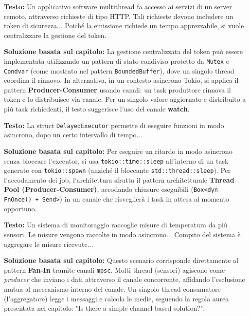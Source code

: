 \begin{exambox}
\textbf{Testo:} Un applicativo software multithread fa accesso ai servizi di un server remoto, attraverso richieste di tipo HTTP. Tali richieste devono includere un token di sicurezza... Poiché la emissione richiede un tempo apprezzabile, si vuole centralizzare la gestione del token.

\textbf{Soluzione basata sul capitolo:} La gestione centralizzata del token può essere implementata utilizzando un pattern di stato condiviso protetto da \texttt{Mutex} e \texttt{Condvar} (come mostrato nel pattern \texttt{BoundedBuffer}), dove un singolo thread coordina il rinnovo. In alternativa, in un contesto asincrono Tokio, si applica il pattern \textbf{Producer-Consumer} usando canali: un task produttore rinnova il token e lo distribuisce via canale. Per un singolo valore aggiornato e distribuito a più task richiedenti, il testo suggerisce l'uso del canale \textbf{watch}.
\end{exambox}

\begin{exambox}
\textbf{Testo:} La struct \texttt{DelayedExecutor} permette di eseguire funzioni in modo asincrono, dopo un certo intervallo di tempo...

\textbf{Soluzione basata sul capitolo:} Per eseguire un ritardo in modo asincrono senza bloccare l'executor, si usa \texttt{tokio::time::sleep} all'interno di un task generato con \texttt{tokio::spawn} (anziché il bloccante \texttt{std::thread::sleep}). Per l'accodamento dei job, l'architettura sfrutta il pattern architetturale \textbf{Thread Pool (Producer-Consumer)}, accodando chiusure eseguibili (\texttt{Box<dyn FnOnce() + Send>}) in un canale che risveglierà i task in attesa al momento opportuno.
\end{exambox}

\begin{exambox}
\textbf{Testo:} Un sistema di monitoraggio raccoglie misure di temperatura da più sensori. Le misure vengono raccolte in modo asincrono... Compito del sistema è aggregare le misure ricevute...

\textbf{Soluzione basata sul capitolo:} Questo scenario corrisponde direttamente al pattern \textbf{Fan-In} tramite canali \texttt{mpsc}. Molti thread (sensori) agiscono come \textit{producer} che inviano i dati attraverso il canale concorrente, affidando l'esclusione mutua al meccanismo interno del canale. Un singolo thread consumatore (l'aggregatore) legge i messaggi e calcola le medie, seguendo la regola aurea presentata nel capitolo: "Is there a simple channel-based solution?".
\end{exambox}

